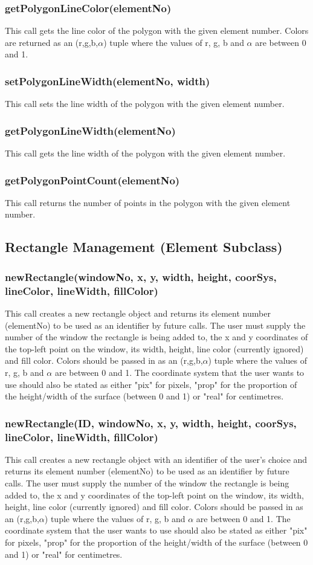 \documentclass{acm_proc_article-sp}
\begin{document}
\subsubsection{getPolygonLineColor(elementNo)}
This call gets the line color of the polygon with the given element number. Colors are returned as an (r,g,b,$\alpha$) tuple where the values of r, g, b and $\alpha$ are between 0 and 1.
\subsubsection{setPolygonLineWidth(elementNo, width)}
This call sets the line width of the polygon with the given element number.
\subsubsection{getPolygonLineWidth(elementNo)}
This call gets the line width of the polygon with the given element number.
\subsubsection{getPolygonPointCount(elementNo)}
This call returns the number of points in the polygon with the given element number.
\subsection{Rectangle Management (Element Subclass)}
\subsubsection{newRectangle(windowNo, x, y, width, height, coorSys, lineColor, lineWidth, fillColor)}
This call creates a new rectangle object and returns its element number (elementNo) to be used as an identifier by future calls. The user must supply the number of the window the rectangle is being added to, the x and y coordinates of the top-left point on the window, its width, height, line color (currently ignored) and fill color. Colors should be passed in as an (r,g,b,$\alpha$) tuple where the values of r, g, b and $\alpha$ are between 0 and 1. The coordinate system that the user wants to use should also be stated as either "pix" for pixels, "prop" for the proportion of the height/width of the surface (between 0 and 1) or "real" for centimetres.
\subsubsection{newRectangle(ID, windowNo, x, y, width, height, coorSys, lineColor, lineWidth, fillColor)}
This call creates a new rectangle object with an identifier of the user's choice and returns its element number (elementNo) to be used as an identifier by future calls. The user must supply the number of the window the rectangle is being added to, the x and y coordinates of the top-left point on the window, its width, height, line color (currently ignored) and fill color. Colors should be passed in as an (r,g,b,$\alpha$) tuple where the values of r, g, b and $\alpha$ are between 0 and 1. The coordinate system that the user wants to use should also be stated as either "pix" for pixels, "prop" for the proportion of the height/width of the surface (between 0 and 1) or "real" for centimetres.
\end{document}
